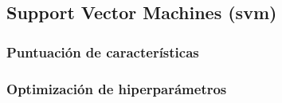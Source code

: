 \subsection{Support Vector Machines (\acrshort{svm})}
\label{sec:svm}






\subsubsection{Puntuación de características}

\subsubsection{Optimización de hiperparámetros}














